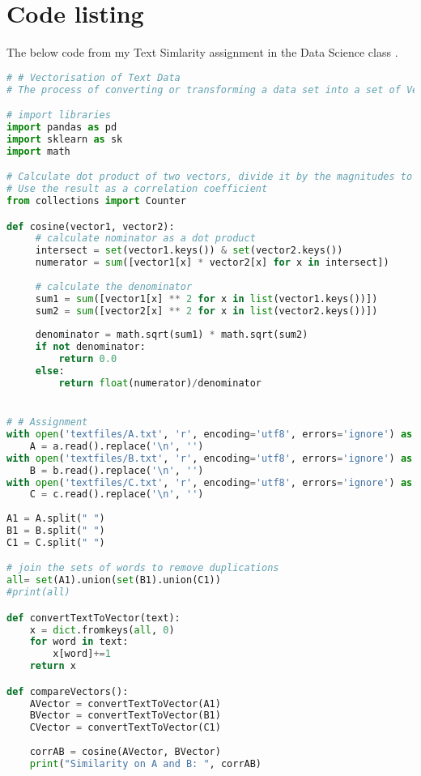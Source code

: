 \section{Code listing}
The below code from my Text Simlarity assignment in the Data Science class \parencite{dsc-text-similarity}.\\

\begin{lstlisting}[language=Python]
# # Vectorisation of Text Data
# The process of converting or transforming a data set into a set of Vectors is called Vectorization.

# import libraries
import pandas as pd
import sklearn as sk
import math 

# Calculate dot product of two vectors, divide it by the magnitudes to find the cos(angle between them)
# Use the result as a correlation coefficient 
from collections import Counter

def cosine(vector1, vector2):
     # calculate nominator as a dot product
     intersect = set(vector1.keys()) & set(vector2.keys())
     numerator = sum([vector1[x] * vector2[x] for x in intersect])
    
     # calculate the denominator 
     sum1 = sum([vector1[x] ** 2 for x in list(vector1.keys())])
     sum2 = sum([vector2[x] ** 2 for x in list(vector2.keys())])
    
     denominator = math.sqrt(sum1) * math.sqrt(sum2)
     if not denominator:
         return 0.0
     else:
         return float(numerator)/denominator


# # Assignment
with open('textfiles/A.txt', 'r', encoding='utf8', errors='ignore') as a:
    A = a.read().replace('\n', '')
with open('textfiles/B.txt', 'r', encoding='utf8', errors='ignore') as b:
    B = b.read().replace('\n', '')
with open('textfiles/C.txt', 'r', encoding='utf8', errors='ignore') as c:
    C = c.read().replace('\n', '')
    
A1 = A.split(" ") 
B1 = B.split(" ") 
C1 = C.split(" ") 

# join the sets of words to remove duplications
all= set(A1).union(set(B1).union(C1))
#print(all)

def convertTextToVector(text):
    x = dict.fromkeys(all, 0) 
    for word in text:
        x[word]+=1
    return x

def compareVectors():
    AVector = convertTextToVector(A1)
    BVector = convertTextToVector(B1)
    CVector = convertTextToVector(C1)
    
    corrAB = cosine(AVector, BVector)
    print("Similarity on A and B: ", corrAB)
    

\end{lstlisting}
